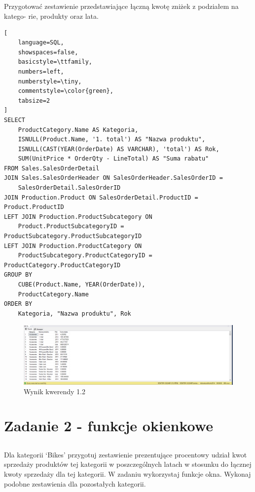 \documentclass[a4paper,12pt]{article}
\begin{document}
\subsection{}

Przygotować zestawienie przedstawiające łączną kwotę zniżek z podziałem na katego-
rie, produkty oraz lata.

  {\small
    \begin{lstlisting}[
	language=SQL,
	showspaces=false,
	basicstyle=\ttfamily,
	numbers=left,
	numberstyle=\tiny,
	commentstyle=\color{green},
	tabsize=2
]
SELECT 
    ProductCategory.Name AS Kategoria, 
    ISNULL(Product.Name, '1. total') AS "Nazwa produktu", 
    ISNULL(CAST(YEAR(OrderDate) AS VARCHAR), 'total') AS Rok, 
    SUM(UnitPrice * OrderQty - LineTotal) AS "Suma rabatu" 
FROM Sales.SalesOrderDetail
JOIN Sales.SalesOrderHeader ON SalesOrderHeader.SalesOrderID = 
    SalesOrderDetail.SalesOrderID
JOIN Production.Product ON SalesOrderDetail.ProductID = Product.ProductID
LEFT JOIN Production.ProductSubcategory ON 
    Product.ProductSubcategoryID = ProductSubcategory.ProductSubcategoryID
LEFT JOIN Production.ProductCategory ON 
    ProductSubcategory.ProductCategoryID = ProductCategory.ProductCategoryID
GROUP BY 
    CUBE(Product.Name, YEAR(OrderDate)),
	ProductCategory.Name
ORDER BY 
    Kategoria, "Nazwa produktu", Rok
\end{lstlisting}}

\begin{figure}[H]
  \centering
  \includegraphics[width=1.0\textwidth]{images/1.2.png}
  \caption{Wynik kwerendy 1.2}
\end{figure}

\section{Zadanie 2 - funkcje okienkowe}

\subsection{}

Dla kategorii ‘Bikes’ przygotuj zestawienie prezentujące procentowy udział kwot
sprzedaży produktów tej kategorii w poszczególnych latach w stosunku do łącznej
kwoty sprzedaży dla tej kategorii. W zadaniu wykorzystaj funkcje okna.
Wykonaj podobne zestawienia dla pozostałych kategorii.
\end{document}
